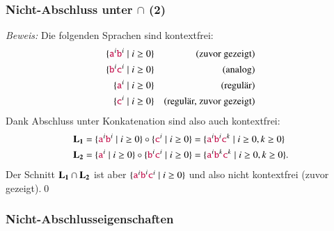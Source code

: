 \documentclass[onlymath]{beamer}
\begin{document}
\begin{frame}\frametitle{Nicht-Abschluss unter $\cap$ (2)}


\emph{Beweis:} Die folgenden Sprachen sind kontextfrei:
\begin{align*}
\{\Sterm{a}^i\Sterm{b}^i\mid i\geq 0\} && \text{(zuvor gezeigt)}\\
\{\Sterm{b}^i\Sterm{c}^i\mid i\geq 0\} && \text{(analog)}\\
\{\Sterm{a}^i\mid i\geq 0\} && \text{(regulär)}\\
\{\Sterm{c}^i\mid i\geq 0\} && \text{(regulär, zuvor gezeigt)}
\end{align*}\pause
% 
Dank Abschluss unter Konkatenation sind also auch kontextfrei:
\begin{align*}
\Slangsub{L}{1}&=\{\Sterm{a}^i\Sterm{b}^i\mid i\geq 0\}\circ \{\Sterm{c}^i\mid i\geq 0\} = \{\Sterm{a}^i\Sterm{b}^i\Sterm{c}^k\mid i\geq 0, k\geq 0\}\\
\Slangsub{L}{2}&=\{\Sterm{a}^i\mid i\geq 0\}\circ \{\Sterm{b}^i\Sterm{c}^i\mid i\geq 0\} = \{\Sterm{a}^i\Sterm{b}^k\Sterm{c}^k\mid i\geq 0, k\geq 0\}.
\end{align*}\pause
Der Schnitt $\Slangsub{L}{1}\cap\Slangsub{L}{2}$ ist aber $\{\Sterm{a}^i\Sterm{b}^i\Sterm{c}^i\mid i\geq 0\}$ und
also nicht kontextfrei (zuvor gezeigt).\qed


\end{frame}

\begin{frame}\frametitle{Nicht-Abschlusseigenschaften}


\end{frame}
\end{document}
